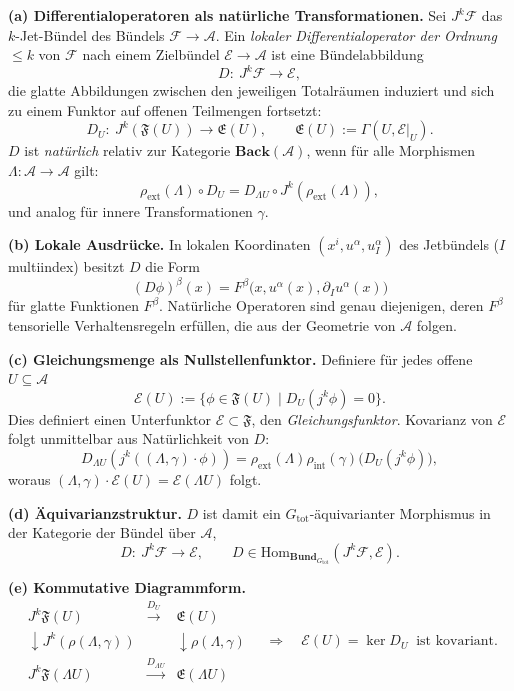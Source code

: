 \documentclass[10pt, letterpaper]{article}
\begin{document}
\textbf{(a) Differentialoperatoren als natürliche Transformationen.}
Sei $J^k\mathcal F$ das $k$-Jet-Bündel des Bündels $\mathcal F\to\mathcal A$.
Ein \emph{lokaler Differentialoperator der Ordnung $\le k$} von $\mathcal F$
nach einem Zielbündel $\mathcal E\to\mathcal A$ ist eine Bündelabbildung
\[
D:\ J^k\mathcal F \longrightarrow \mathcal E,
\]
die glatte Abbildungen zwischen den jeweiligen Totalräumen induziert und sich zu einem
Funktor auf offenen Teilmengen fortsetzt:
\[
D_U:\ J^k(\mathfrak F(U)) \longrightarrow \mathfrak E(U),
\qquad
\mathfrak E(U):=\Gamma(U,\mathcal E|_U).
\]
$D$ ist \emph{natürlich} relativ zur Kategorie $\mathbf{Back}(\mathcal A)$,
wenn für alle Morphismen $\Lambda:\mathcal A\to\mathcal A$ gilt:
\[
\rho_{\mathrm{ext}}(\Lambda)\circ D_U
= D_{\Lambda U}\circ J^k(\rho_{\mathrm{ext}}(\Lambda)),
\]
und analog für innere Transformationen $\gamma$.

\textbf{(b) Lokale Ausdrücke.}
In lokalen Koordinaten $(x^i,u^\alpha,u^\alpha_I)$ des Jetbündels
($I$ multiindex) besitzt $D$ die Form
\[
(D\phi)^\beta(x)
= F^\beta\big(x,u^\alpha(x),\partial_I u^\alpha(x)\big)
\]
für glatte Funktionen $F^\beta$.
Natürliche Operatoren sind genau diejenigen, deren $F^\beta$ tensorielle
Verhaltensregeln erfüllen, die aus der Geometrie von $\mathcal A$ folgen.

\textbf{(c) Gleichungsmenge als Nullstellenfunktor.}
Definiere für jedes offene $U\subseteq\mathcal A$
\[
\mathcal E(U) := \{\phi\in\mathfrak F(U)\mid D_U(j^k\phi)=0\}.
\]
Dies definiert einen Unterfunktor $\mathcal E\subset\mathfrak F$,
den \emph{Gleichungsfunktor}.
Kovarianz von $\mathcal E$ folgt unmittelbar aus Natürlichkeit von $D$:
\[
D_{\Lambda U}(j^k((\Lambda,\gamma)\cdot\phi))
= \rho_{\mathrm{ext}}(\Lambda)\rho_{\mathrm{int}}(\gamma)
\big(D_U(j^k\phi)\big),
\]
woraus $(\Lambda,\gamma)\cdot\mathcal E(U)=\mathcal E(\Lambda U)$ folgt.

\textbf{(d) Äquivarianzstruktur.}
$D$ ist damit ein $G_{\mathrm{tot}}$-äquivarianter Morphismus in der Kategorie
der Bündel über $\mathcal A$,
\[
D:\ J^k\mathcal F \longrightarrow \mathcal E,\qquad
D\in \mathrm{Hom}_{\mathbf{Bund}_{G_{\mathrm{tot}}}}(J^k\mathcal F,\mathcal E).
\]

\textbf{(e) Kommutative Diagrammform.}
\[
\begin{array}{ccc}
J^k\mathfrak F(U) & \xrightarrow{D_U} & \mathfrak E(U)\\
\downarrow J^k(\rho(\Lambda,\gamma)) & & \downarrow \rho(\Lambda,\gamma)\\
J^k\mathfrak F(\Lambda U) & \xrightarrow{D_{\Lambda U}} & \mathfrak E(\Lambda U)
\end{array}
\quad
\Rightarrow\quad
\mathcal E(U)=\ker D_U\ \text{ ist kovariant.}
\]
\end{document}
